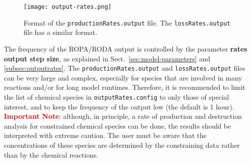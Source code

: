 \begin{figure}[htb]
  \centering
  \texttt{[image: output-rates.png]}
  \caption{Format of the \texttt{productionRates.output} file. The
    \texttt{lossRates.output} file has a similar format.}
  \label{fig:ropa}
\end{figure}

The frequency of the ROPA/RODA output is controlled by the
parameter \textbf{rates output step size}, as explained in
Sect.~\ref{sec:model-parameters} and \ref{subsec:outputrates}. The
\texttt{productionRates.output} and \texttt{lossRates.output} files
can be very large and complex, especially for species that are
involved in many reactions and/or for long model runtimes. Therefore,
it is recommended to limit the list of chemical species in
\texttt{outputRates.config} to only those of special interest, and to
keep the frequency of the output low (the default is 1 hour).\\

\textcolor{red}{\bf Important Note}: although, in principle, a rate of
production and destruction analysis for constrained chemical species
can be done, the results should be interpreted with extreme
caution. The user must be aware that the concentrations of these
species are determined by the constraining data rather than by the
chemical reactions.
